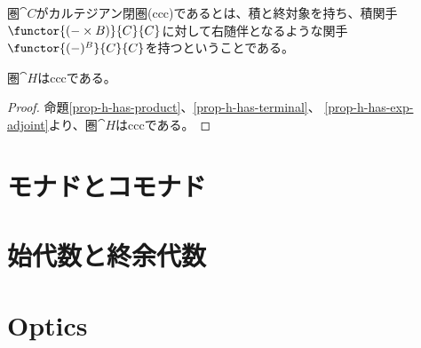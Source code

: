 \documentclass[uplatex,dvipdfmx]{jsarticle}
\begin{document}
  \begin{define}[カルテジアン閉圏]\label{def-ccc}
    圏$\cat{C}$がカルテジアン閉圏(ccc)であるとは、積と終対象を持ち、積関手$\functor{(-\times B)}{C}{C}$に対して右随伴となるような関手$\functor{(-)^{B}}{C}{C}$を持つということである。
  \end{define}
  \begin{prop}\label{prop-h-is-ccc}
    圏$\cat{H}$はcccである。
  \end{prop}
  \begin{proof}
    命題\ref{prop-h-has-product}、\ref{prop-h-has-terminal}、
    \ref{prop-h-has-exp-adjoint}より、圏$\cat{H}$はcccである。
  \end{proof}
  \section{モナドとコモナド}
  \section{始代数と終余代数}
  \section{Optics}
\end{document}
